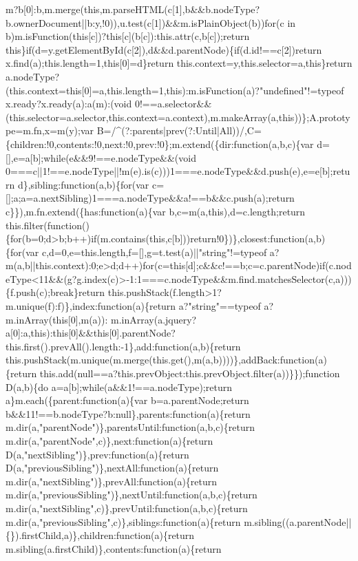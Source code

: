 \begin{DoxyCode}
{       m?b[0]:b,m.merge(this,m.parseHTML(c[1],b&&b.nodeType?b.ownerDocument||b:y,!0)),u.test(c[1])&&m.isPlainObject(b))for(c in
       b)m.isFunction(this[c])?this[c](b[c]):this.attr(c,b[c]);return
       this\}if(d=y.getElementById(c[2]),d&&d.parentNode)\{if(d.id!==c[2])return x.find(a);this.length=1,this[0]=d\}return this.context=y,this.selector=a,this\}return
       a.nodeType?(this.context=this[0]=a,this.length=1,this):m.isFunction(a)?"undefined"!=typeof
       x.ready?x.ready(a):a(m):(void
       0!==a.selector&&(this.selector=a.selector,this.context=a.context),m.makeArray(a,this))\};A.prototype=m.fn,x=m(y);var
       B=/^(?:parents|prev(?:Until|All))/,C=\{children:!0,contents:!0,next:!0,prev:!0\};m.extend(\{dir:function(a,b,c)\{var d=[],e=a[b];while(e&&9!==e.nodeType&&(void
       0===c||1!==e.nodeType||!m(e).is(c)))1===e.nodeType&&d.push(e),e=e[b];return d\},sibling:function(a,b)\{for(var
       c=[];a;a=a.nextSibling)1===a.nodeType&&a!==b&&c.push(a);return c\}\}),m.fn.extend(\{has:function(a)\{var b,c=m(a,this),d=c.length;return
       this.filter(function()\{for(b=0;d>b;b++)if(m.contains(this,c[b]))return!0\})\},closest:function(a,b)\{for(var
       c,d=0,e=this.length,f=[],g=t.test(a)||"string"!=typeof
       a?m(a,b||this.context):0;e>d;d++)for(c=this[d];c&&c!==b;c=c.parentNode)if(c.nodeType<11&&(g?g.index(c)>-1:1===c.nodeType&&m.find.matchesSelector(c,a)))\{f.push(c);break\}return
       this.pushStack(f.length>1?m.unique(f):f)\},index:function(a)\{return a?"string"==typeof
       a?m.inArray(this[0],m(a)):
      m.inArray(a.jquery?a[0]:a,this):this[0]&&this[0].parentNode?this.first().prevAll().length:-1\},add:function(a,b)\{return this.pushStack(m.unique(m.merge(this.get(),m(a,b))))\},addBack:function(a)\{return
       this.add(null==a?this.prevObject:this.prevObject.filter(a))\}\});function D(a,b)\{do a=a[b];while(a&&1!==a.nodeType);return
       a\}m.each(\{parent:function(a)\{var b=a.parentNode;return b&&11!==b.nodeType?b:null\},parents:function(a)\{return
       m.dir(a,"parentNode")\},parentsUntil:function(a,b,c)\{return m.dir(a,"parentNode",c)\},next:function(a)\{return
       D(a,"nextSibling")\},prev:function(a)\{return D(a,"previousSibling")\},nextAll:function(a)\{return
       m.dir(a,"nextSibling")\},prevAll:function(a)\{return m.dir(a,"previousSibling")\},nextUntil:function(a,b,c)\{return
       m.dir(a,"nextSibling",c)\},prevUntil:function(a,b,c)\{return m.dir(a,"previousSibling",c)\},siblings:function(a)\{return
       m.sibling((a.parentNode||\{\}).firstChild,a)\},children:function(a)\{return
       m.sibling(a.firstChild)\},contents:function(a)\{return
}
\end{DoxyCode}
